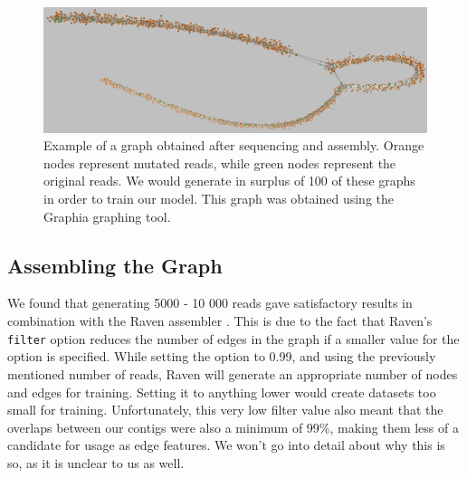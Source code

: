 \documentclass[times, utf8, diplomski, english]{fer_eng}
\begin{document}
\begin{figure}[h]
	\centering
	\includegraphics[width=\textwidth]{images/graph_example.png}
	\caption[Graph]{Example of a graph obtained after sequencing and assembly. Orange nodes represent mutated reads, while green nodes represent the original reads. We would generate in surplus of 100 of these graphs in order to train our model. This graph was obtained using the Graphia\footnotemark{} graphing tool.}
	\label{fig:graph}
\end{figure}

\subsection{Assembling the Graph}
\label{subsec:assembling the graph}

We found that generating 5000 - 10 000 reads gave satisfactory results in combination with the Raven assembler \cite{Vaser}. This is due to the fact that Raven's \texttt{filter} option reduces the number of edges in the graph if a smaller value for the option is specified. While setting the option to 0.99, and using the previously mentioned number of reads, Raven will generate an appropriate number of nodes and edges for training. Setting it to anything lower would create datasets too small for training. Unfortunately, this very low filter value also meant that the overlaps between our contigs were also a minimum of 99\%, making them less of a candidate for usage as edge features. We won't go into detail about why this is so, as it is unclear to us as well.
\end{document}

